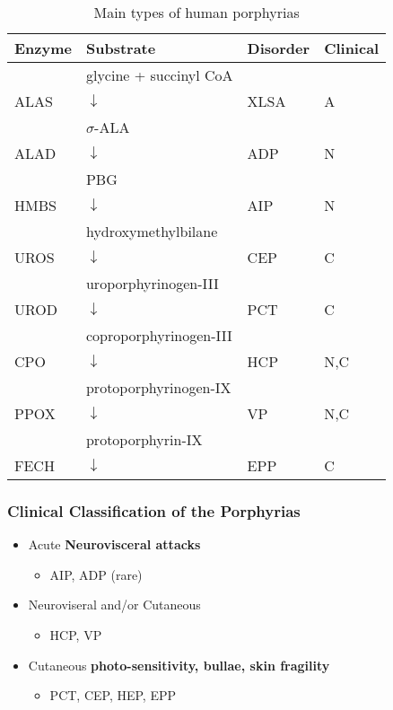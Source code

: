 \documentclass[12pt]{scrartcl}
\begin{document}
\begin{table}[htbp]
\caption{\label{tab:org3ba13e3}Main types of human porphyrias}
\centering
\begin{tabular}{llll}
Enzyme & Substrate & Disorder & Clinical\footnotemark\\
\hline
 & glycine + succinyl CoA &  & \\
ALAS & \(\downarrow\) & XLSA & A\\
 & \(\sigma\)-ALA &  & \\
ALAD & \(\downarrow\) & ADP & N\\
 & PBG &  & \\
HMBS & \(\downarrow\) & AIP & N\\
 & hydroxymethylbilane &  & \\
UROS & \(\downarrow\) & CEP & C\\
 & uroporphyrinogen-III &  & \\
UROD & \(\downarrow\) & PCT & C\\
 & coproporphyrinogen-III &  & \\
CPO & \(\downarrow\) & HCP & N,C\\
 & protoporphyrinogen-IX &  & \\
PPOX & \(\downarrow\) & VP & N,C\\
 & protoporphyrin-IX &  & \\
FECH & \(\downarrow\) & EPP & C\\
\end{tabular}
\end{table}

\subsubsection{Clinical Classification of the Porphyrias}
\label{sec:orgfa35965}
\begin{itemize}
\item Acute \textbf{Neurovisceral attacks}
\begin{itemize}
\item AIP, ADP (rare)
\end{itemize}

\item Neuroviseral and/or Cutaneous
\begin{itemize}
\item HCP, VP
\end{itemize}

\item Cutaneous \textbf{photo-sensitivity, bullae, skin fragility}
\begin{itemize}
\item PCT, CEP, HEP, EPP
\end{itemize}
\end{itemize}
\end{document}
